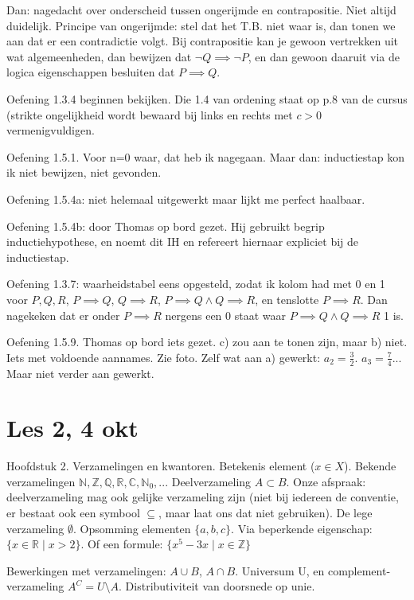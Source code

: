 \documentclass{article}
\begin{document}
Dan: nagedacht over onderscheid tussen ongerijmde en contrapositie. Niet altijd duidelijk. Principe van ongerijmde: stel dat het T.B. niet waar is, dan tonen we aan dat er een contradictie volgt. Bij contrapositie kan je gewoon vertrekken uit wat algemeenheden, dan bewijzen dat $\neg Q \implies \neg P$, en dan gewoon daaruit via de logica eigenschappen besluiten dat $P \implies Q$. 

Oefening 1.3.4 beginnen bekijken. Die 1.4 van ordening staat op p.8 van de cursus (strikte ongelijkheid wordt bewaard bij links en rechts met $c>0$ vermenigvuldigen. 

Oefening 1.5.1. Voor n=0 waar, dat heb ik nagegaan. Maar dan: inductiestap kon ik niet bewijzen, niet gevonden. 

Oefening 1.5.4a: niet helemaal uitgewerkt maar lijkt me perfect haalbaar. 

Oefening 1.5.4b: door Thomas op bord gezet. Hij gebruikt begrip inductiehypothese, en noemt dit IH en refereert hiernaar expliciet bij de inductiestap. 

Oefening 1.3.7: waarheidstabel eens opgesteld, zodat ik kolom had met 0 en 1 voor $P, Q, R$, $P \implies Q$, $Q \implies R$, $P \implies Q \land Q \implies R$, en tenslotte $P \implies R$. Dan nagekeken dat er onder  $P \implies R$ nergens een 0 staat waar $P \implies Q \land Q \implies R$ 1 is. 

Oefening 1.5.9. Thomas op bord iets gezet. c) zou aan te tonen zijn, maar b) niet. Iets met voldoende aannames. Zie foto. 
Zelf wat aan a) gewerkt: $a_2 = \frac{3}{2}$. $a_3 = \frac{7}{4}$... Maar niet verder aan gewerkt. 


\section{Les 2, 4 okt}

Hoofdstuk 2. Verzamelingen en kwantoren. Betekenis element ($x \in X$). Bekende verzamelingen $\mathbb{N}, \mathbb{Z}, \mathbb{Q}, \mathbb{R}, \mathbb{C}, \mathbb{N}_0, ... $
Deelverzameling $A \subset B$. Onze afspraak: deelverzameling mag ook gelijke verzameling zijn (niet bij iedereen de conventie, er bestaat ook een symbool $\subseteq$, maar laat ons dat niet gebruiken). De lege verzameling $\emptyset$. Opsomming elementen $\{a,b,c\}$. Via beperkende eigenschap: $\{x\in \mathbb{R} \mid x>2 \} $. Of een formule: $\{x^5 -3x  \mid  x \in \mathbb{Z} \} $

Bewerkingen met verzamelingen: $A \cup B$, $A \cap B$. Universum U, en complement-verzameling $A^C = U \setminus A$. Distributiviteit van doorsnede op unie. 
\end{document}
